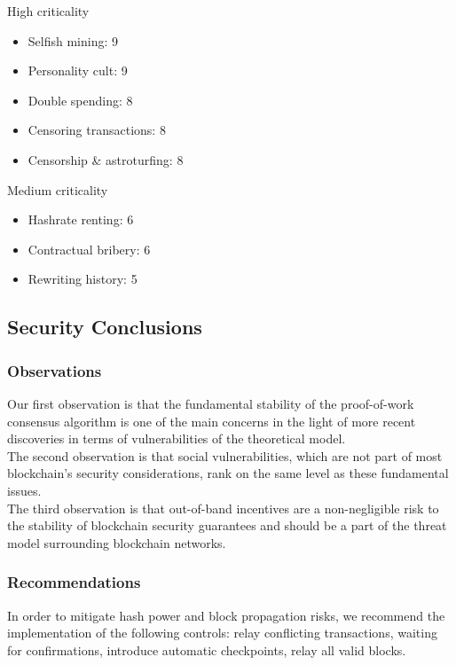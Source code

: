 \documentclass[12pt,a4paper]{article}
\begin{document}
High criticality
\begin{itemize}
  \item Selfish mining: 9
  \item Personality cult: 9
  \item Double spending: 8
  \item Censoring transactions: 8
  \item Censorship \& astroturfing: 8
\end{itemize}

Medium criticality
\begin{itemize}
  \item Hashrate renting: 6
  \item Contractual bribery: 6
  \item Rewriting history: 5
\end{itemize}

\subsection{Security Conclusions}

\subsubsection{Observations}

Our first observation is that the fundamental stability of the proof-of-work consensus algorithm is one of the main concerns in the light of more recent discoveries in terms of vulnerabilities of the theoretical model.\\

The second observation is that social vulnerabilities, which are not part of most blockchain's security considerations, rank on the same level as these fundamental issues.\\

The third observation is that out-of-band incentives are a non-negligible risk to the stability of blockchain security guarantees and should be a part of the threat model surrounding blockchain networks.\\

\subsubsection{Recommendations}

In order to mitigate hash power and block propagation risks, we recommend the implementation of the following controls: relay conflicting transactions, waiting for confirmations, introduce automatic checkpoints, relay all valid blocks.\\
\end{document}

